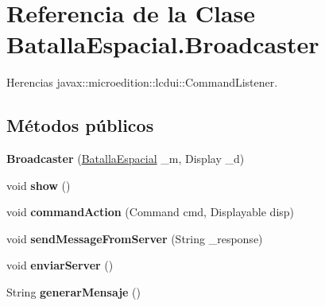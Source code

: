 \hypertarget{classBatallaEspacial_1_1Broadcaster}{
\section{Referencia de la Clase BatallaEspacial.Broadcaster}
\label{classBatallaEspacial_1_1Broadcaster}
}


Herencias javax::microedition::lcdui::CommandListener.

\subsection*{Métodos públicos}
\begin{DoxyCompactItemize}
\item 
\hypertarget{classBatallaEspacial_1_1Broadcaster_a424162f517b54271bb3a2061e5169ece}{
{\bfseries Broadcaster} (\hyperlink{classBatallaEspacial_1_1BatallaEspacial}{BatallaEspacial} \_\-m, Display \_\-d)}
\label{classBatallaEspacial_1_1Broadcaster_a424162f517b54271bb3a2061e5169ece}

\item 
\hypertarget{classBatallaEspacial_1_1Broadcaster_a15841b652b0e618cafd5c4d1fd878f5f}{
void {\bfseries show} ()}
\label{classBatallaEspacial_1_1Broadcaster_a15841b652b0e618cafd5c4d1fd878f5f}

\item 
\hypertarget{classBatallaEspacial_1_1Broadcaster_ada3cd57d45bae2f435f41da542204416}{
void {\bfseries commandAction} (Command cmd, Displayable disp)}
\label{classBatallaEspacial_1_1Broadcaster_ada3cd57d45bae2f435f41da542204416}

\item 
\hypertarget{classBatallaEspacial_1_1Broadcaster_a2676c470d280526f4655b7770d12245b}{
void {\bfseries sendMessageFromServer} (String \_\-response)}
\label{classBatallaEspacial_1_1Broadcaster_a2676c470d280526f4655b7770d12245b}

\item 
\hypertarget{classBatallaEspacial_1_1Broadcaster_ad7b5b5b6a2b074967b04406d9d2e4c97}{
void {\bfseries enviarServer} ()}
\label{classBatallaEspacial_1_1Broadcaster_ad7b5b5b6a2b074967b04406d9d2e4c97}

\item 
\hypertarget{classBatallaEspacial_1_1Broadcaster_a5202f4cdca2e7031311dcdc47d7dce73}{
String {\bfseries generarMensaje} ()}
\label{classBatallaEspacial_1_1Broadcaster_a5202f4cdca2e7031311dcdc47d7dce73}


\end{DoxyCompactItemize}

